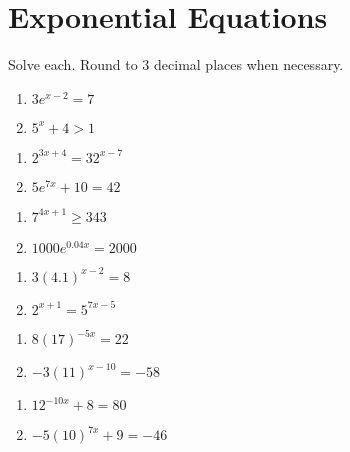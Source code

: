 \chapter{Exponential Equations}

Solve each. Round to 3 decimal places when necessary.
\begin{multicols}{2}
\begin{enumerate}
	\item $3e^{x-2} = 7$
	\item $5^x + 4 > 1$
\end{enumerate} \setcounter{Review}{\value{enumi}}
\end{multicols}
\begin{multicols}{2}
\begin{enumerate}	\setcounter{enumi}{\value{Review}}
	\item $2^{3x+4} = 32^{x-7}$
	\item $5e^{7x} + 10 = 42$
\end{enumerate} \setcounter{Review}{\value{enumi}}
\end{multicols}
\begin{multicols}{2}
\begin{enumerate}	\setcounter{enumi}{\value{Review}}
	\item $7^{4x+1} \geq 343$
	\item $1000e^{0.04x} = 2000$
\end{enumerate} \setcounter{Review}{\value{enumi}}
\end{multicols}
\begin{multicols}{2}
\begin{enumerate}	\setcounter{enumi}{\value{Review}}
	\item $3(4.1)^{x-2} = 8$
	\item $2^{x+1} = 5^{7x-5}$
\end{enumerate} \setcounter{Review}{\value{enumi}}
\end{multicols}
\begin{multicols}{2}
\begin{enumerate}	\setcounter{enumi}{\value{Review}}
	\item $8(17)^{-5x} = 22$
	\item $-3(11)^{x-10} = -58$
\end{enumerate} \setcounter{Review}{\value{enumi}}
\end{multicols}
\begin{multicols}{2}
\begin{enumerate}	\setcounter{enumi}{\value{Review}}
	\item $12^{-10x}+8=80$
	\item $-5(10)^{7x}+9 = -46$
\end{enumerate} \setcounter{Review}{\value{enumi}}
\end{multicols}
